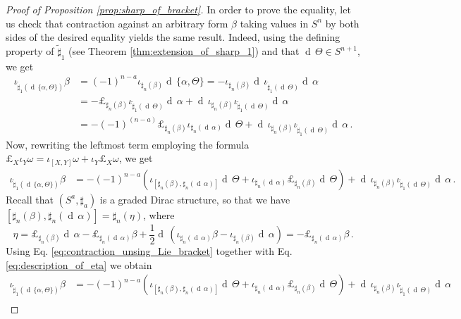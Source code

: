 \documentclass[10pt,a4paper]{amsart}
\newcommand{\dd}{\operatorname{d}\,}
\begin{document}
\begin{proof}[Proof of Proposition \ref{prop:sharp_of_bracket}] In order to prove the equality, let us check that contraction against an arbitrary form $\beta$ taking values in $S^n$ by both sides of the desired equality yields the same result. Indeed, using the defining property of $\widetilde \sharp_1$ (see Theorem \ref{thm:extension_of_sharp_1}) and that $\dd \Theta \in S^{n+1}$,  we get
\begin{align*}
    \iota_{\widetilde \sharp_1(\dd \{\alpha, \Theta\})} \beta &= (-1)^{n-a} \iota_{\sharp_n(\beta)} \dd \{\alpha, \Theta\} = - \iota_{\sharp_n(\beta)} \dd \iota_{\widetilde \sharp_1(\dd \Theta) }\dd \alpha\\
    &= - \pounds_{\sharp_n(\beta)} \iota_{\widetilde \sharp_1(\dd \Theta)} \dd \alpha + \dd \iota_{\sharp_n(\beta)} \iota_{\widetilde \sharp_1(\dd \Theta)} \dd \alpha\\
    &= - (-1)^{(n-a)}\pounds_{\sharp_n(\beta)} \iota_{ \sharp_n(\dd \alpha)} \dd \Theta + \dd \iota_{\sharp_n(\beta)} \iota_{\widetilde \sharp_1(\dd \Theta)} \dd \alpha\,.
\end{align*}
Now, rewriting the leftmost term employing the formula $\pounds_X \iota_Y \omega  = \iota_{[X, Y]}\omega + \iota_Y \pounds_X \omega$, we get
\begin{align}
    \iota_{\widetilde \sharp_1(\dd \{\alpha, \Theta\})} \beta &= - (-1)^{n-a} \left(\iota_{[\sharp_n(\beta), \sharp_n(\dd \alpha)]} \dd \Theta + \iota_{\sharp_n(\dd \alpha)}  \pounds_{\sharp_n(\beta)} \dd \Theta \right)+\dd \iota_{\sharp_n(\beta)} \iota_{\widetilde \sharp_1(\dd \Theta)} \dd \alpha\,.
    \label{eq:contraction_unsing_Lie_bracket}
\end{align}
Recall that $(S^a, \sharp_a)$ is a graded Dirac structure, so that we have
$[\sharp_n(\beta), \sharp_n(\dd \alpha)] = \sharp_n(\eta)$, where 
\begin{equation}
    \eta = \pounds_{\sharp_n(\beta)} \dd \alpha - \pounds_{\sharp_n(\dd \alpha)} \beta + \frac{1}{2} \dd \left( \iota_{\sharp_n(\dd \alpha)} \beta - \iota_{\sharp_n(\beta)} \dd \alpha\right) = - \pounds_{\sharp_n(\dd \alpha)} \beta\,.
    \label{eq:description_of_eta}
\end{equation}
Using Eq. \eqref{eq:contraction_unsing_Lie_bracket} together with Eq. \eqref{eq:description_of_eta} we obtain
\begin{align*}
    \iota_{\widetilde \sharp_1(\dd \{\alpha, \Theta\})} \beta &=- (-1)^{n-a} \left(\iota_{[\sharp_n(\beta), \sharp_n(\dd \alpha)]} \dd \Theta + \iota_{\sharp_n(\dd \alpha)}  \pounds_{\sharp_n(\beta)} \dd \Theta \right)+\dd \iota_{\sharp_n(\beta)} \iota_{\widetilde \sharp_1(\dd \Theta)} \dd \alpha\\

\end{align*}
\end{proof}
\end{document}
